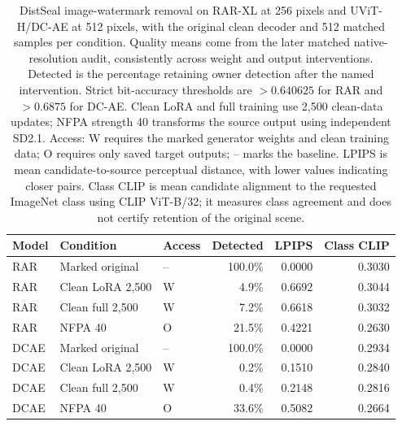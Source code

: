 \begin{table}[t]\centering\small
\begin{tabular}{lllrrr}\toprule
Model & Condition & Access & Detected & LPIPS & Class CLIP\\\midrule
RAR & Marked original & -- & 100.0\% & 0.0000 & 0.3030 \\
RAR & Clean LoRA 2,500 & W & 4.9\% & 0.6692 & 0.3044 \\
RAR & Clean full 2,500 & W & 7.2\% & 0.6618 & 0.3032 \\
RAR & NFPA 40 & O & 21.5\% & 0.4221 & 0.2630 \\
DCAE & Marked original & -- & 100.0\% & 0.0000 & 0.2934 \\
DCAE & Clean LoRA 2,500 & W & 0.2\% & 0.1510 & 0.2840 \\
DCAE & Clean full 2,500 & W & 0.4\% & 0.2148 & 0.2816 \\
DCAE & NFPA 40 & O & 33.6\% & 0.5082 & 0.2664 \\
\bottomrule\end{tabular}
\caption{DistSeal image-watermark removal on RAR-XL at 256 pixels and UViT-H/DC-AE at 512 pixels, with the original clean decoder and 512 matched samples per condition. Quality means come from the later matched native-resolution audit, consistently across weight and output interventions. Detected is the percentage retaining owner detection after the named intervention. Strict bit-accuracy thresholds are $>0.640625$ for RAR and $>0.6875$ for DC-AE. Clean LoRA and full training use 2,500 clean-data updates; NFPA strength 40 transforms the source output using independent SD2.1. Access: W requires the marked generator weights and clean training data; O requires only saved target outputs; -- marks the baseline. LPIPS is mean candidate-to-source perceptual distance, with lower values indicating closer pairs. Class CLIP is mean candidate alignment to the requested ImageNet class using CLIP ViT-B/32; it measures class agreement and does not certify retention of the original scene.}\end{table}
